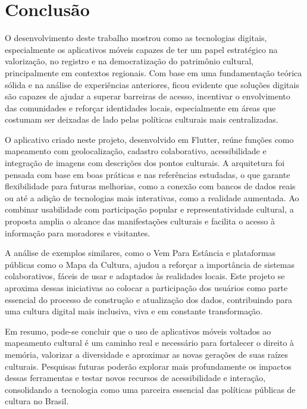 \chapter{Conclusão}

O desenvolvimento deste trabalho mostrou como as tecnologias digitais, especialmente os aplicativos móveis capazes de ter um papel estratégico na valorização, no registro e na democratização do patrimônio cultural, principalmente em contextos regionais. Com base em uma fundamentação teórica sólida e na análise de experiências anteriores, ficou evidente que soluções digitais são capazes de ajudar a superar barreiras de acesso, incentivar o envolvimento das comunidades e reforçar identidades locais, especialmente em áreas que costumam ser deixadas de lado pelas políticas culturais mais centralizadas.

O aplicativo criado neste projeto, desenvolvido em Flutter, reúne funções como mapeamento com geolocalização, cadastro colaborativo, acessibilidade e integração de imagens com descrições dos pontos culturais. A arquitetura foi pensada com base em boas práticas e nas referências estudadas, o que garante flexibilidade para futuras melhorias, como a conexão com bancos de dados reais ou até a adição de tecnologias mais interativas, como a realidade aumentada. Ao combinar usabilidade com participação popular e representatividade cultural, a proposta amplia o alcance das manifestações culturais e facilita o acesso à informação para moradores e visitantes.

A análise de exemplos similares, como o Vem Para Estância e plataformas públicas como o Mapa da Cultura, ajudou a reforçar a importância de sistemas colaborativos, fáceis de usar e adaptados às realidades locais. Este projeto se aproxima dessas iniciativas ao colocar a participação dos usuários como parte essencial do processo de construção e atualização dos dados, contribuindo para uma cultura digital mais inclusiva, viva e em constante transformação.

Em resumo, pode-se concluir que o uso de aplicativos móveis voltados ao mapeamento cultural é um caminho real e necessário para fortalecer o direito à memória, valorizar a diversidade e aproximar as novas gerações de suas raízes culturais. Pesquisas futuras poderão explorar mais profundamente os impactos dessas ferramentas e testar novos recursos de acessibilidade e interação, consolidando a tecnologia como uma parceira essencial das políticas públicas de cultura no Brasil.
